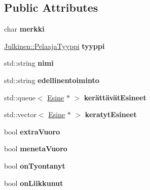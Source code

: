 \subsection*{Public Attributes}
\begin{DoxyCompactItemize}
\item 
\hypertarget{class_pelaaja_a02bdc32a1602c04fc09565dd798bc2ee}{}char {\bfseries merkki}\label{class_pelaaja_a02bdc32a1602c04fc09565dd798bc2ee}

\item 
\hypertarget{class_pelaaja_a8d801247c05210f893e2bea4581c2921}{}\hyperlink{namespace_julkinen_ad9a0a9e01af78249f584a93b03db4329}{Julkinen\+::\+Pelaaja\+Tyyppi} {\bfseries tyyppi}\label{class_pelaaja_a8d801247c05210f893e2bea4581c2921}

\item 
\hypertarget{class_pelaaja_aa078f73c51dbd0093a15ce3b13799355}{}std\+::string {\bfseries nimi}\label{class_pelaaja_aa078f73c51dbd0093a15ce3b13799355}

\item 
\hypertarget{class_pelaaja_aa4fca4902c77288a27d0924ca8232653}{}std\+::string {\bfseries edellinentoiminto}\label{class_pelaaja_aa4fca4902c77288a27d0924ca8232653}

\item 
\hypertarget{class_pelaaja_aed59d61a02879aee8e06bcf9444e1c7e}{}std\+::queue$<$ \hyperlink{class_esine}{Esine} $\ast$ $>$ {\bfseries kerättävät\+Esineet}\label{class_pelaaja_aed59d61a02879aee8e06bcf9444e1c7e}

\item 
\hypertarget{class_pelaaja_acdb0a8c22d4c7c53c6f37925166fa894}{}std\+::vector$<$ \hyperlink{class_esine}{Esine} $\ast$ $>$ {\bfseries keratyt\+Esineet}\label{class_pelaaja_acdb0a8c22d4c7c53c6f37925166fa894}

\item 
\hypertarget{class_pelaaja_a96e6bda620a26db66ccb5abe2dbc4014}{}bool {\bfseries extra\+Vuoro}\label{class_pelaaja_a96e6bda620a26db66ccb5abe2dbc4014}

\item 
\hypertarget{class_pelaaja_a6484c51c4abc90f56dcdff8c7ab4cbf6}{}bool {\bfseries meneta\+Vuoro}\label{class_pelaaja_a6484c51c4abc90f56dcdff8c7ab4cbf6}

\item 
\hypertarget{class_pelaaja_a0d5674f0d949024ccf3330fe074384f2}{}bool {\bfseries on\+Tyontanyt}\label{class_pelaaja_a0d5674f0d949024ccf3330fe074384f2}

\item 
\hypertarget{class_pelaaja_a55e8ede0cb70c5666158146ae563cef2}{}bool {\bfseries on\+Liikkunut}\label{class_pelaaja_a55e8ede0cb70c5666158146ae563cef2}

\end{DoxyCompactItemize}



